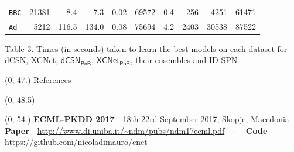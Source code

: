 \documentclass[final]{beamer}
\begin{document}
\begin{frame}{}
\begin{textblock}{17.5}
\begin{table}[t]
\begin{tabular}{l rrr r r r r r r}
    \texttt{BBC}&21381&8.4&7.3&	0.02&69572&0.4& 256& 4251 &61471\\ 
    \texttt{Ad}&5212&116.5&134.0&	0.08&75694&4.2&2403 & 30538 &87522\\ 
    \bottomrule
  \end{tabular}
  \label{tab:exptimes}
\end{table}
\hspace{50pt}\begin{minipage}{0.8\linewidth}
 \scriptsize Table 3. Times (in seconds) taken to learn the best models on each dataset
for \textsf{dCSN}, \textsf{XCNet}, $\mathsf{dCSN_{PoB}}$, $\mathsf{XCNet_{PoB}}$, their ensembles
and \textsf{ID-SPN}
\end{minipage}
  \end{textblock}


  


  
  \begin{textblock}{80}(0, 47.)
    References
  \end{textblock}


 \setlength{\columnsep}{3cm}
 \begin{textblock}{58.5}(0, 48.5)
   \small
   \begin{multicols}{3}
    \setlength\bibitemsep{8pt}
    \printbibliography[heading=none]
    \end{multicols}
  \end{textblock}




  



  \begin{textblock}{78}(0, 54.)
    \small
    \textbf{ECML-PKDD 2017}  -  18th-22rd September 2017, Skopje,
    Macedonia\hfill
    \textbf{Paper} - 
    {\url{http://www.di.uniba.it/~ndm/pubs/ndm17ecml.pdf}}\ \ $\cdotp$ \ \
        \textbf{Code} - 
    {\url{https://github.com/nicoladimauro/cnet}}
  \end{textblock}
  
\end{frame}
\end{document}
